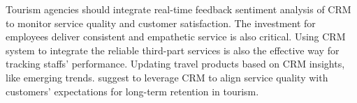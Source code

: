 Tourism agencies should integrate real-time feedback sentiment analysis of CRM to monitor service quality and customer satisfaction. The investment for employees deliver consistent and empathetic service is also critical. Using CRM system to integrate the reliable third-part services is also the effective way for tracking staffs' performance. Updating travel products based on CRM insights, like emerging trends. \cite{Kumar2023EnhancingLoyalty} suggest to leverage CRM to align service quality with customers' expectations for long-term retention in tourism.
